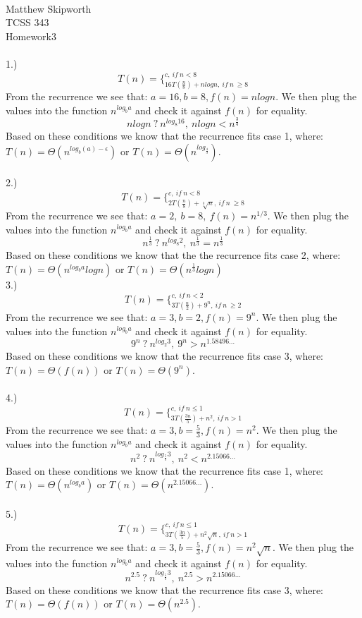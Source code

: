 \documentclass[page=4,11pt]{article}
\begin{document}
\ \\
Matthew Skipworth\\
TCSS 343\\
Homework3\\ \\
1.) $$T(n)= \Bigg\{^{c,\ if\ n<8}_{16T(\frac{n}{8})+nlogn,\ if\ n\ \geq 8}$$
From the recurrence we see that: $a=16, b=8, f(n)=nlogn$.
We then plug the values into the function $n^{log_{b}a}$ and check
it against $f(n)$ for equality.
$$nlogn\ ?\ n^{log_{8}16},\ nlogn<n^{\frac{3}{4}}$$
Based on these conditions we know that the recurrence fits case 1, 
where: $T(n)= \Theta(n^{log_{b}(a)-\epsilon})$ or $T(n)=  \Theta(n^{log_{\frac{4}{3}}})$.\\ \\
2.) $$T(n)= \Bigg\{^{c,\ if\ n<8}_{2T(\frac{n}{8})+\sqrt[3]{n},\ if\ n\ \geq 8}$$
From the recurrence we see that: $a=2,\ b=8,\ f(n)=n^{1/3}$.
We then plug the values into the function $n^{log_{b}a}$ and check
it against $f(n)$ for equality.
$$n^{ \frac{1}{3}}\ ?\ n^{log_{8}2},\ n^{ \frac{1}{3}}=n^{ \frac{1}{3}}$$
Based on these conditions we know that the the recurrence fits case 2, where: $T(n)= \Theta(n^{log_{b}a}logn)$ or $T(n)=\Theta(n^{\frac{1}{3}}logn)$\\
3.) $$T(n)= \Bigg\{^{c,\ if\ n<2}_{3T(\frac{n}{2})+9^{n},\ if\ n\ \geq 2}$$
From the recurrence we see that: $a=3, b=2, f(n)=9^n$.
We then plug the values into the function $n^{log_{b}a}$ and check
it against $f(n)$ for equality.
$$9^n\ ?\ n^{log_{2}3},\ 9^n>n^{1.58496 \dots}$$
Based on these conditions we know that the recurrence fits case 3, 
where: $T(n)= \Theta(f(n))$ or $T(n)=  \Theta(9^n)$.\\ \\
4.) $$T(n)= \Bigg\{^{c,\ if\ n\leq1}_{3T(\frac{3n}{5})+n^{2},\ if\ n > 1}$$
From the recurrence we see that: $a=3, b=\frac{5}{3}, f(n)=n^{2}$.
We then plug the values into the function $n^{log_{b}a}$ and check
it against $f(n)$ for equality.
$$n^{2}\ ?\ n^{log_{\frac{5}{3}}3},\ n^2<n^{2.15066 \dots}$$
Based on these conditions we know that the recurrence fits case 1, 
where: $T(n)= \Theta(n^{log_ba})$ or $T(n)=  \Theta(n^{2.15066 \dots})$.\\ \\
5.) $$T(n)= \Bigg\{^{c,\ if\ n\leq1}_{3T(\frac{3n}{5})+n^{2}\sqrt{n},\ if\ n > 1}$$
From the recurrence we see that: $a=3, b=\frac{5}{3}, f(n)=n^{2}\sqrt{n}$.
We then plug the values into the function $n^{log_{b}a}$ and check
it against $f(n)$ for equality.
$$n^{2.5}\ ?\ n^{log_{\frac{5}{3}}3},\ n^{2.5}>n^{2.15066 \dots}$$
Based on these conditions we know that the recurrence fits case 3, 
where: $T(n)= \Theta(f(n))$ or $T(n)=  \Theta(n^{2.5})$.\\ \\
\end{document}
